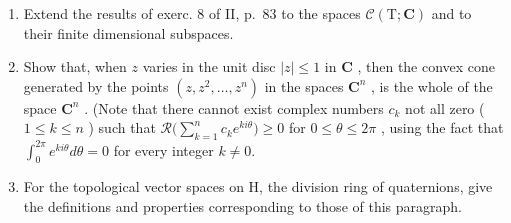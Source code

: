 \exercisegroup

\begin{enumerate}
\def\labelenumi{\arabic{enumi})}
\item
  Extend the results of exerc. 8 of II, p.~83 to the spaces \(\mathcal{C}(\mathrm{T};\mathbf{C})\) and to their finite dimensional subspaces.
\item
  Show that, when \(z\) varies in the unit disc \(|z| \leqslant 1\) in \(\mathbf{C}\) , then the convex cone generated by the points \((z, z^2, \dots, z^n)\) in the spaces \(\mathbf{C}^n\) , is the whole of the space \(\mathbf{C}^n\) . (Note that there cannot exist complex numbers \(c_k\) not all zero ( \(1 \leqslant k \leqslant n\) ) such that \(\mathcal{R}\big(\sum_{k=1}^{n} c_k e^{ki\theta}\big) \geqslant 0\) for \(0 \leqslant \theta \leqslant 2\pi\) , using the fact that \(\int_0^{2\pi}e^{ki\theta}d\theta = 0\) for every integer \(k\neq 0.\)
\item
  For the topological vector spaces on H, the division ring of quaternions, give the definitions and properties corresponding to those of this paragraph.
\end{enumerate}

